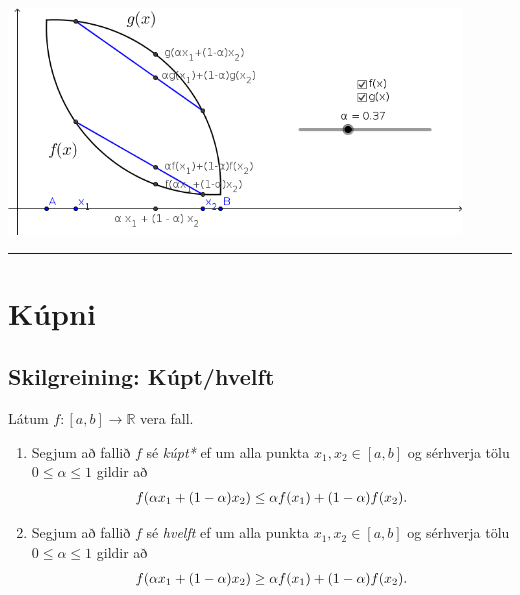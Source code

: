 \documentclass[b5paper,10pt,icelandic]{sphinxmanual}
\begin{document}
\begin{center}
\includegraphics[width=12cm,keepaspectratio=true]{01_kupni.png}
\end{center}



\bigskip\hrule{}\bigskip



\section{Kúpni}
\label{kafli05:kupni}

\subsection{Skilgreining: Kúpt/hvelft}
\label{kafli05:skilgreining-kupt-hvelft}\label{kafli05:index-0}
Látum \(f:[a, b]\rightarrow {\mathbb  R}\) vera fall.
\begin{enumerate}
\item {} 
Segjum að fallið \(f\) sé \textit{kúpt*} ef um
alla punkta \(x_1, x_2\in [a, b]\) og sérhverja tölu
\(0\leq
\alpha\leq 1\) gildir að
\begin{gather}
\begin{split}f(\alpha x_1+(1-\alpha)x_2)\leq \alpha f(x_1)+(1-\alpha)f(x_2).\end{split}\notag
\end{gather}
\item {} 
Segjum að fallið \(f\) sé \textit{hvelft}
ef um alla punkta \(x_1, x_2\in [a, b]\) og sérhverja tölu
\(0\leq
\alpha\leq 1\) gildir að
\begin{gather}
\begin{split}f(\alpha x_1+(1-\alpha)x_2)\geq \alpha f(x_1)+(1-\alpha)f(x_2).\end{split}\notag
\end{gather}
\end{enumerate}
\end{document}
